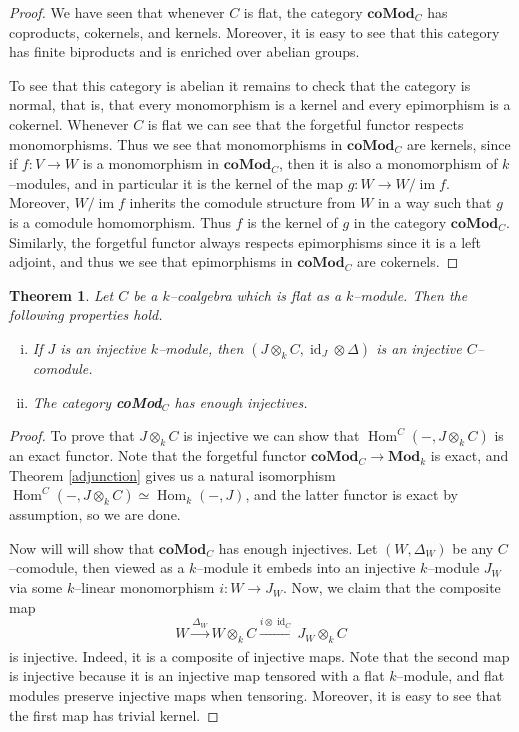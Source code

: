 \documentclass{article}
\theoremstyle{plain}
\newtheorem{Th}{Theorem}[section]
\theoremstyle{definition}
\DeclareMathOperator{\im}{im}
\DeclareMathOperator{\id}{id}
\DeclareMathOperator{\Hom}{Hom}
\begin{document}
\begin{proof}
    We have seen that whenever $C$ is flat, the category $\textbf{coMod}_C$ has coproducts, cokernels, and kernels. Moreover, it is easy to see that this category has finite biproducts and is enriched over abelian groups.

    To see that this category is abelian it remains to check that the category is normal, that is, that every monomorphism is a kernel and every epimorphism is a cokernel. Whenever $C$ is flat we can see that the forgetful functor respects monomorphisms. Thus we see that monomorphisms in $\textbf{coMod}_C$ are kernels, since if $f:V\to W$ is a monomorphism in $\textbf{coMod}_C$, then it is also a monomorphism of $k$--modules, and in particular it is the kernel of the map $g:W\to W/\im f$. Moreover, $W/\im f$ inherits the comodule structure from $W$ in a way such that $g$ is a comodule homomorphism. Thus $f$ is the kernel of $g$ in the category $\textbf{coMod}_C$. Similarly, the forgetful functor always respects epimorphisms since it is a left adjoint, and thus we see that epimorphisms in $\textbf{coMod}_C$ are cokernels.
\end{proof}


\begin{Th}\label{injectives}
    Let $C$ be a $k$--coalgebra which is flat as a $k$--module. Then the following properties hold. 
    \begin{enumerate}[(i)]
        \item If $J$ is an injective $k$--module, then $(J\otimes_k C, \id_J\otimes \Delta)$ is an injective $C$--comodule.
        \item The category \emph{\textbf{coMod}}$_C$ has enough injectives.
    \end{enumerate} 
\end{Th}

\begin{proof}
    To prove that $J\otimes_k C$ is injective we can show that $\Hom^C(-, J\otimes_k C)$ is an exact functor. Note that the forgetful functor $\mathbf{coMod}_C\to \mathbf{Mod}_k$ is exact, and Theorem \ref{adjunction} gives us a natural isomorphism $\Hom^C(-, J\otimes_k C)\simeq \Hom_k(-, J)$, and the latter functor is exact by assumption, so we are done. 
    
    Now will will show that $\textbf{coMod}_C$ has enough injectives. Let $(W, \Delta_W)$ be any $C$--comodule, then viewed as a $k$--module it embeds into an injective $k$--module $J_W$ via some $k$--linear monomorphism $i\colon W\to J_W$. Now, we claim that  the composite map 
    \[
    W\xrightarrow[]{\Delta_W} W\otimes_k C \xrightarrow[]{i\otimes \id_C} J_W\otimes_k C
    \]
    is injective. Indeed, it is a composite of injective maps. Note that the second map is injective because it is an injective map tensored with a flat $k$--module, and flat modules preserve injective maps when tensoring. Moreover, it is easy to see that the first map has trivial kernel.
\end{proof}
\end{document}
